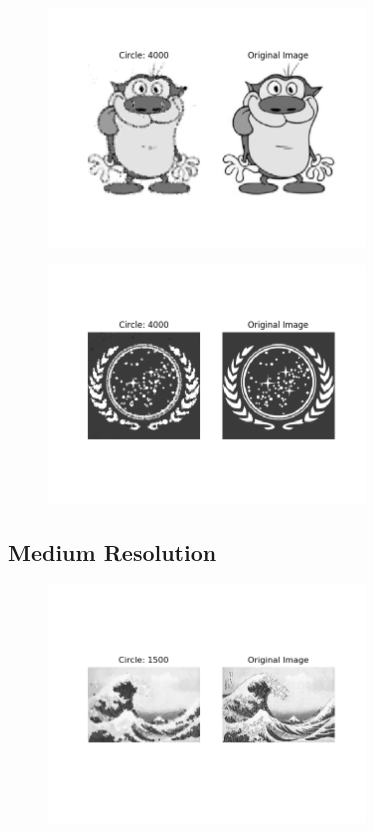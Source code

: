 \documentclass[12pt]{article}
\begin{document}
\begin{figure}[H]
\centering
\noindent\includegraphics[width=0.75\textwidth]{../results/stimpy/stimpy_4000}
\end{figure}

\begin{figure}[H]
\centering
\noindent\includegraphics[width=0.75\textwidth]{../results/ufop/ufop_4000}
\end{figure}



\newpage
\subsection*{Medium Resolution}
\begin{figure}[H]
\centering
\noindent\includegraphics[width=0.75\textwidth]{../results/wave/wave_1500}
\end{figure}
\end{document}
